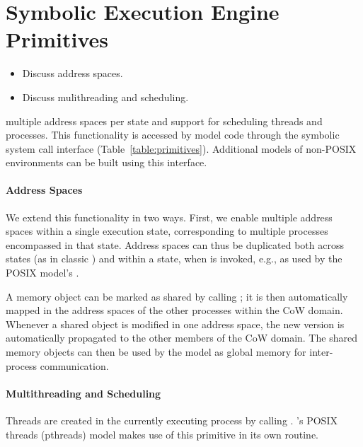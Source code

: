 
\section{Symbolic Execution Engine Primitives}

\begin{itemize}
\item Discuss address spaces.
\item Discuss mulithreading and scheduling.
\end{itemize}

 multiple address spaces per state and support for scheduling threads and processes.  This functionality is accessed by model code through the symbolic system call interface (Table~\ref{table:primitives}).  Additional models of non-POSIX environments can be built using this interface.

\paragraph{Address Spaces}    We extend this functionality in two ways.  First, we enable multiple address spaces within a single execution state, corresponding to multiple processes encompassed in that state. Address spaces can thus be duplicated both across states (as in classic \klee) and within a state, when  is invoked, e.g., as used by the POSIX model's .

  A memory object can be marked as shared by calling ; it is then automatically mapped in the address spaces of the other processes within the CoW domain.  Whenever a shared object is modified in one address space, the new version is automatically propagated to the other members of the CoW domain.  The shared memory objects can then be used by the model as global memory for inter-process communication.

\paragraph{Multithreading and Scheduling}  Threads are created in the currently executing process by calling .  \cnine's POSIX threads (pthreads) model makes use of this primitive in its own  routine.

